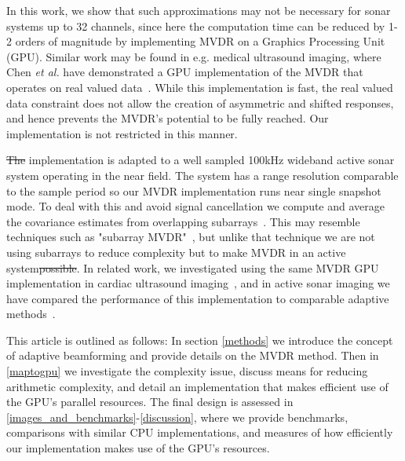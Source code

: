 \documentclass[12pt,journal,draftclsnofoot,onecolumn]{IEEEtran}
\newcommand\1{\vec 1}
\providecommand{\DIFaddtex}[1]{{\protect\color{blue}\uwave{#1}}} %
\providecommand{\DIFdeltex}[1]{{\protect\color{red}\sout{#1}}}                      %
\providecommand{\DIFaddbegin}{} %
\providecommand{\DIFaddend}{} %
\providecommand{\DIFdelbegin}{} %
\providecommand{\DIFdelend}{} %
\providecommand{\DIFadd}[1]{\texorpdfstring{\DIFaddtex{#1}}{#1}} %
\providecommand{\DIFdel}[1]{\texorpdfstring{\DIFdeltex{#1}}{}} %
\begin{document}
% 
% 


In this work, we show that such approximations may not be necessary for sonar systems up to 32 channels, since here the computation time can be reduced by 1-2 orders of magnitude by implementing MVDR on a Graphics Processing Unit (GPU). Similar work may be found in e.g. medical ultrasound imaging, where Chen \emph{et al.} have demonstrated a GPU implementation of the MVDR that operates on real valued data~\cite{Chen2011,Chen2011a}. While this implementation is fast, the real valued data constraint does not allow the creation of asymmetric and shifted responses, and hence prevents the MVDR's potential to be fully reached. Our implementation is not restricted in this manner.

\DIFdelbegin \DIFdel{The }\DIFdelend \DIFaddbegin \DIFadd{Our }\DIFaddend implementation is adapted to a well sampled 100\;kHz wideband active sonar system operating in the near field. The system has a range resolution comparable to the sample period so our MVDR implementation runs \DIFaddbegin \DIFadd{in }\DIFaddend near single snapshot mode. To deal with this and \DIFaddbegin \DIFadd{to }\DIFaddend avoid signal cancellation we compute and average the covariance estimates from overlapping subarrays~\cite{Kailath1985}. This may resemble techniques such as "subarray MVDR"~\cite{Chapman1976}, but unlike that technique we are not using subarrays to reduce complexity but to make \DIFaddbegin \DIFadd{it feasible to use }\DIFaddend MVDR in an active system\DIFdelbegin \DIFdel{possible}\DIFdelend . In related work, we investigated using the same MVDR GPU implementation in cardiac ultrasound imaging~\cite{Asen2012,Asen2013}, and in active sonar imaging we have compared the performance of this implementation to comparable adaptive methods~\cite{Buskenes2013}.

This article is outlined as follows: In section \ref{methods} we introduce the concept of adaptive beamforming and provide details on the MVDR method. Then in \ref{maptogpu} we investigate the complexity issue, discuss means for reducing arithmetic complexity, and detail an implementation that makes efficient use of the GPU's parallel resources. The final design is assessed in \ref{images_and_benchmarks}-\ref{discussion}, where we provide benchmarks, comparisons with similar CPU implementations, and measures of how efficiently our implementation makes use of the GPU's resources.
\end{document}
